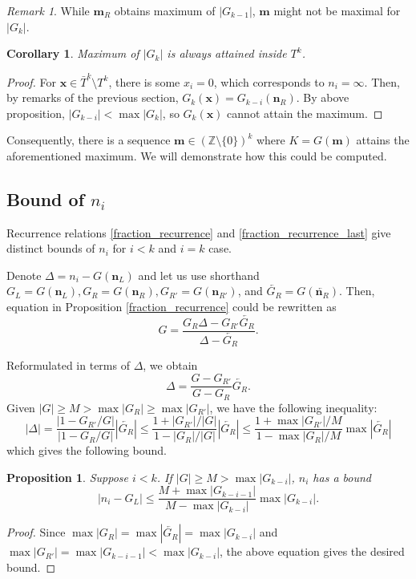 \documentclass{article}
\theoremstyle{definition}
\theoremstyle{plain}
\newtheorem{corollary}[theorem]{Corollary}
\newtheorem{proposition}{Proposition}[section]
\theoremstyle{remark}
\newtheorem*{remark}{Remark}
\numberwithin{equation}{section}
\newcommand{\bZ}{\mathbb{Z}}
\newcommand{\abs}[1]{\left\lvert{#1}\right\rvert}
\begin{document}
\begin{remark}
  While $\mathbf{m}_R$ obtains maximum of $\abs{G_{k-1}}$, $\mathbf{m}$ might not be maximal for $\abs{G_k}$.
\end{remark}

\begin{corollary}
  Maximum of $\abs{G_k}$ is always attained inside $T^k$.
\end{corollary}
\begin{proof}
  For $\mathbf{x} \in \bar{T}^k \setminus T^k$, there is some $x_i = 0$, which corresponds to $n_i = \infty$.
  Then, by remarks of the previous section, $G_k(\mathbf{x}) = G_{k-i}(\mathbf{n}_R)$.
  By above proposition, $\abs{G_{k-i}} < \max \abs{G_k}$, so $G_k(\mathbf{x})$ cannot attain the maximum.
\end{proof}

Consequently, there is a sequence $\mathbf{m} \in (\bZ \setminus \{ 0 \})^k$
where $K = G(\mathbf{m})$ attains the aforementioned maximum.
We will demonstrate how this could be computed.

\subsection{Bound of $n_i$}

Recurrence relations \ref{fraction_recurrence} and \ref{fraction_recurrence_last}
give distinct bounds of $n_i$ for $i < k$ and $i = k$ case.

Denote $\Delta = n_i - G(\mathbf{n}_L)$ and let us use shorthand
$G_L = G(\mathbf{n}_L), G_R = G(\mathbf{n}_R),
  G_{R'} = G(\mathbf{n}_{R'})$, and $\overleftarrow{G_R} = G(\overleftarrow{\mathbf{n}_R})$.
Then, equation in Proposition \ref{fraction_recurrence} could be rewritten as
\[
  G = \frac{G_R \Delta - G_{R'} \overleftarrow{G_R}}{\Delta - \overleftarrow{G_R}}.
\]

Reformulated in terms of $\Delta$, we obtain
\[
  \Delta = \frac{G - G_{R'}}{G - G_R} \overleftarrow{G_R}.
\]
Given $|G| \geq M > \max \abs{G_R} \geq \max \abs{G_{R'}}$, we have the following inequality:
\[
  |\Delta| = \frac{\abs{1 - G_{R'} / G}}{\abs{1 - G_R / G}} \abs{\overleftarrow{G_R}}
  \leq \frac{1 + \abs{G_{R'}} / \abs{G}}{1 - \abs{G_R} / \abs{G}} \abs{\overleftarrow{G_R}}
  \leq \frac{1 + \max \abs{G_{R'}} / M}{1 - \max \abs{G_R} / M} \max \abs{\overleftarrow{G_R}}
\]
which gives the following bound.

\begin{proposition}\label{fraction_bound}
  Suppose $i < k$. If $|G| \geq M > \max \abs{G_{k-i}}$, $n_i$ has a bound
  \[
    \abs{n_i - G_L} \leq \frac{M + \max \abs{G_{k-i-1}}}{M - \max \abs{G_{k-i}}} \max \abs{G_{k-i}}.
  \]
\end{proposition}
\begin{proof}
  Since $\max \abs{G_R} = \max \abs{\overleftarrow{G_R}} = \max \abs{G_{k - i}}$
  and $\max \abs{G_{R'}} = \max \abs{G_{k-i-1}} < \max \abs{G_{k - i}}$,
  the above equation gives the desired bound.
\end{proof}
\end{document}
